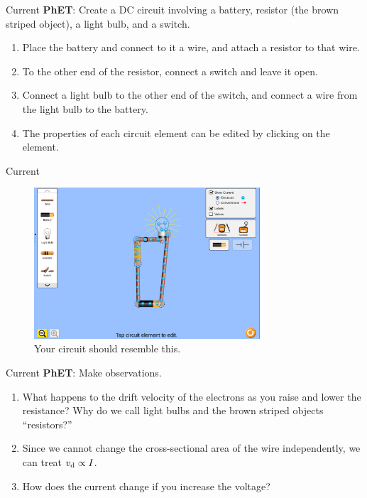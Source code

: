 \documentclass{beamer}
\begin{document}
\begin{frame}{Current}
\textbf{\alert{PhET}}: Create a DC circuit involving a battery, resistor (the brown striped object), a light bulb, and a switch.
\begin{enumerate}
\item Place the battery and connect to it a wire, and attach a resistor to that wire.
\item To the other end of the resistor, connect a switch and leave it open.
\item Connect a light bulb to the other end of the switch, and connect a wire from the light bulb to the battery.
\item The properties of each circuit element can be edited by clicking on the element.
\end{enumerate}
\end{frame}

\begin{frame}{Current}
\begin{figure}
\centering
\includegraphics[width=0.75\textwidth]{figures/PhETBulb.png}
\caption{\label{fig:phetb} Your circuit should resemble this.}
\end{figure}
\end{frame}

\begin{frame}{Current}
\textbf{\alert{PhET}}: Make observations.
\begin{enumerate}
\item What happens to the drift velocity of the electrons as you raise and lower the resistance?  Why do we call light bulbs and the brown striped objects ``resistors?''
\item Since we cannot change the cross-sectional area of the wire independently, we can treat $v_{\rm d} \propto I$.
\item How does the current change if you increase the voltage?
\end{enumerate}
\end{frame}
\end{document}
